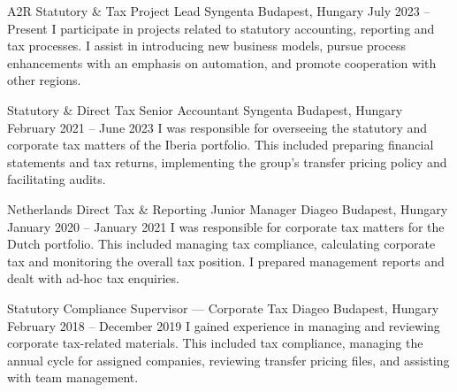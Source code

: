 


\begin{cventries}


  \cventry
    {A2R Statutory \& Tax Project Lead} %
    {Syngenta} %
    {Budapest, Hungary} %
    {July 2023 -- Present} %
    {I participate in projects related to statutory accounting, reporting and tax processes. I assist in introducing new business models, pursue process enhancements with an emphasis on automation, and promote cooperation with other regions.} %
    {} %


  \cventry
    {Statutory \& Direct Tax Senior Accountant} %
    {Syngenta} %
    {Budapest, Hungary} %
    {February 2021 -- June 2023} %
    {I was responsible for overseeing the statutory and corporate tax matters of the Iberia portfolio. This included preparing financial statements and tax returns, implementing the group's transfer pricing policy and facilitating audits.} %
    {} %


  \cventry
    {Netherlands Direct Tax \& Reporting Junior Manager} %
    {Diageo} %
    {Budapest, Hungary} %
    {January 2020 -- January 2021} %
    {I was responsible for corporate tax matters for the Dutch portfolio. This included managing tax compliance, calculating corporate tax and monitoring the overall tax position. I prepared management reports and dealt with ad-hoc tax enquiries.} %
    {} %


  \cventry
    {Statutory Compliance Supervisor — Corporate Tax} %
    {Diageo} %
    {Budapest, Hungary} %
    {February 2018 -- December 2019} %
    {I gained experience in managing and reviewing corporate tax-related materials. This included tax compliance, managing the annual cycle for assigned companies, reviewing transfer pricing files, and assisting with team management.} %
    {} %


\end{cventries}
